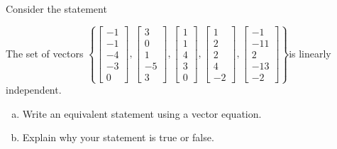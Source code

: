 
\begin{exerciseStatement}


Consider the statement 
\begin{center}\begin{minipage}{0.8\textwidth}
 The set of vectors \( \left\{ \left[\begin{array}{c}
-1 \\
-1 \\
-4 \\
-3 \\
0
\end{array}\right] , \left[\begin{array}{c}
3 \\
0 \\
1 \\
-5 \\
3
\end{array}\right] , \left[\begin{array}{c}
1 \\
1 \\
4 \\
3 \\
0
\end{array}\right] , \left[\begin{array}{c}
1 \\
2 \\
2 \\
4 \\
-2
\end{array}\right] , \left[\begin{array}{c}
-1 \\
-11 \\
2 \\
-13 \\
-2
\end{array}\right] \right\} \)is linearly independent.
\end{minipage}\end{center}
    


\begin{enumerate}[(a)]
\item  Write an equivalent statement using a vector equation.
\item  Explain why your statement is true or false.
\end{enumerate}
    
\end{exerciseStatement}
    
